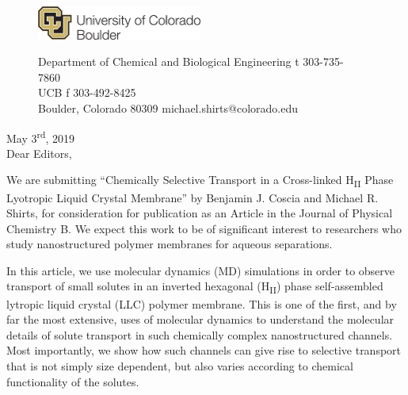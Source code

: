 \documentclass[fontsize=11pt]{article}
\begin{document}
	\graphicspath{{./figures/}}

	\begin{figure}
	\centering
	\begin{minipage}{0.37\textwidth}
	\includegraphics[width=2.14in,left]{CUBoulder.pdf}
	\end{minipage}
	\begin{minipage}{0.62\textwidth}
	\scriptsize
	\noindent Department of Chemical and Biological Engineering \hfill t 303-735-7860~~~~~~~~~~~~~~~~~~ \\
	 UCB \hfill f 303-492-8425~~~~~~~~~~~~~~~~~~ \\
	\noindent Boulder, Colorado 80309 \hfill michael.shirts@colorado.edu \\
	\end{minipage}
	\end{figure}
	
	\noindent May 3\textsuperscript{rd}, 2019\\

	\noindent Dear Editors,\\
	
	\newcommand{\ManuscriptTitle}{Chemically Selective Transport in a Cross-linked 
	H\textsubscript{II} Phase Lyotropic Liquid Crystal Membrane}
	
	We are submitting ``\ManuscriptTitle'' by Benjamin J. Coscia and Michael R. Shirts, for
	consideration for publication as an Article in the Journal of Physical Chemistry
	B. We expect this work to be of significant interest to researchers who study 
	nanostructured polymer membranes for aqueous separations.
	
	In this article, we use molecular dynamics (MD) simulations in
        order to observe transport of small solutes in an inverted
        hexagonal (H\textsubscript{II}) phase self-assembled lytropic
        liquid crystal (LLC) polymer membrane. This is one of the
        first, and by far the most extensive, uses of molecular dynamics
        to understand the molecular details of solute transport in such
        chemically complex nanostructured channels. Most importantly, we
        show how such channels can give rise to selective transport
        that is not simply size dependent, but also varies according
        to chemical functionality of the solutes.
\end{document}
